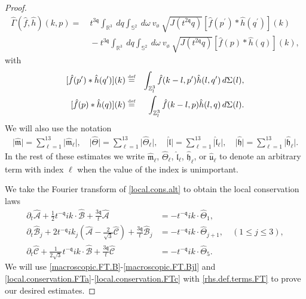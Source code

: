 \documentclass[reqno]{amsart}
\newcommand{\eqdef }{\overset{\mbox{\tiny{def}}}{=}}
\newcommand{\pv}{p}
\newcommand{\qv}{q}
\newcommand{\qq}{\mathfrak{q}}
\newcommand{\tmq}{t^{-\qq}}
\newcommand{\tqq}{t^{2\qq}}
\newcommand{\Emptyset}{\text{\o}}
\newcommand{\highG}{\Theta}
\newcommand{\Z}{\mathbb{Z}}
\newcommand{\Si}{\Sigma}
\theoremstyle{definition}
\numberwithin{equation}{section}
\numberwithin{theorem}{section}
\begin{document}
\begin{proof}
\begin{align}\label{def.GaF}
\widehat{\Gamma}(\hat{f},\hat{h})(k,\pv)
= &~
t^{3\qq}\int_{\mathbb{R}^3} ~  dq 
\int_{\mathbb{S}^{2}} ~ d\omega
~ v_{\Emptyset} ~  
 \sqrt{J(\tqq\qv)}
 [\hat{f}(p^{\prime})*\hat{h}(q^{\prime})](k)
 \\ \nonumber
 &~ -
 t^{3\qq}\int_{\mathbb{R}^3} ~  dq 
\int_{\mathbb{S}^{2}} ~ d\omega
~ v_{\Emptyset} ~  
 \sqrt{J(\tqq\qv)}
 [\hat{f}(p)*\hat{h}(q)](k),
\end{align}
with
\begin{eqnarray*}
{[\hat{f}(\pv^{\prime})*\hat{h}(\qv^{\prime})]}(k) & \eqdef &\int_{\Z^3_l} \hat{f}(k-l,\pv^{\prime})\hat{h}(l,\qv^{\prime})\,d\Si(l),\\
{[\hat{f}(\pv)*\hat{h}(\qv)]}(k)  & \eqdef &\int_{\Z^3_l}  \hat{f}(k-l,\pv)\hat{h}(l,\qv)\,d\Si(l).
\end{eqnarray*}
 We will also use the notation 
\begin{align}\label{index.sum.notation}
\big| \widehat{\mathfrak{m}} \big| = \sum_{\ell=1}^{13} \big| \widehat{\mathfrak{m}}_{\ell}\big|, \quad  
    \big| \widehat{\highG}\big| = \sum_{\ell=1}^{13} \big| \widehat{\highG}_{\ell}\big|, \quad 
    \big| \hat{\mathfrak{l}} \big| = \sum_{\ell=1}^{13} \big| \hat{\mathfrak{l}}_{\ell} \big|, 
    \quad 
    \big| \widehat{\mathfrak{h}} \big| = \sum_{\ell=1}^{13} \big| \widehat{\mathfrak{h}}_{\ell} \big|.
\end{align}
In the rest of these estimates we write $\widehat{\mathfrak{m}}_{\ell}$, $\widehat{\highG}_{\ell}$, $\hat{\mathfrak{l}}_{\ell}$, $\widehat{\mathfrak{h}}_{\ell}$, or $\hat{\mathfrak{u}}_{\ell}$ to denote an arbitrary term with index $\ell$ when the value of the index is unimportant. 

We take the Fourier transform of \eqref{local.cons.alt} to obtain the local conservation laws
\begin{align} \label{local.conservation.FTa}
\partial_t\widehat{\mathcal{A}}
     +
\frac{1}{2}  \tmq ik \cdot \widehat{\mathcal{B}}
+
\frac{3\qq }{t} \widehat{\mathcal{A}}
&=-\tmq ik \cdot \widehat{\highG}_{1},
\\  \label{local.conservation.FTb}
\partial_t\widehat{\mathcal{B}}_j
 +
2\tmq ik_j \left( \widehat{\mathcal{A}}
-\frac{2}{\sqrt{3}}
\widehat{\mathcal{C}}  \right)
+
\frac{3\qq }{t}\widehat{\mathcal{B}}_j
&=-\tmq ik \cdot \widehat{\highG}_{j+1}, \quad (1 \leq j \leq 3),
\\ \label{local.conservation.FTc}
\partial_t\widehat{\mathcal{C}}
  +
\frac{1}{2\sqrt{3}}  \tmq  ik \cdot \widehat{\mathcal{B}}
+
\frac{3\qq }{t} \widehat{\mathcal{C}}
&=-\tmq ik \cdot \widehat{\highG}_{5}.
\end{align}
We will use \eqref{macroscopic.FT.B}-\eqref{macroscopic.FT.Bjl} and \eqref{local.conservation.FTa}-\eqref{local.conservation.FTc} with \eqref{rhs.def.terms.FT} to prove our desired estimates.


\end{proof}
\end{document}
